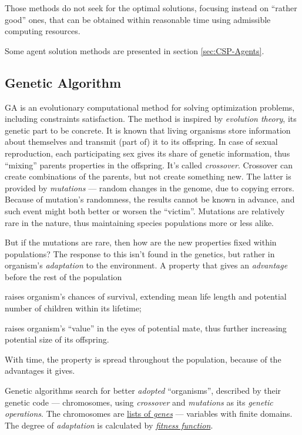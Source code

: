 \documentclass[ThesisDoc]{subfiles}
\begin{document}
\medskip

Those methods do not seek for the optimal solutions, focusing instead on
``rather good'' ones, that can be obtained within reasonable time using admissible
computing resources.

\bigskip

\noindent
Some agent solution methods are presented in section \ref{sec:CSP-Agents}.

\subsection{Genetic Algorithm}
GA is an evolutionary computational method for solving optimization problems,
including constraints satisfaction. The method is inspired by \emph{evolution
theory}, its genetic part to be concrete. It is known that living organisms
store information about themselves and transmit (part of) it to its offspring.
In case of sexual reproduction, each participating sex gives its share of
genetic information, thus ``mixing'' parents properties in the offspring.
It's called \emph{crossover}.
Crossover can create combinations of the parents, but not create something new.
The latter is provided by \emph{mutations} --- random changes in the genome, due
to copying errors. Because of mutation's randomness, the results cannot be known
in advance, and such event might both better or worsen the ``victim''. Mutations
are relatively rare in the nature, thus maintaining species populations more or
less alike.

But if the mutations are rare, then how are the new properties fixed within
populations? The response to this isn't found in the genetics, but rather in
organism's \emph{adaptation} to the environment. A property that gives an
\emph{advantage} before the rest of the population
\begin{enumerate*}[1)]
  \item raises organism's chances of survival, extending mean life length and
        potential number of children within its lifetime;
  \item raises organism's ``value'' in the eyes of potential mate, thus further
        increasing potential size of its offspring.
\end{enumerate*}
With time, the property is spread throughout the population, because of the
advantages it gives.

\bigskip\noindent
Genetic algorithms search for better \emph{adopted} ``organisms'', described
by their genetic code --- chromosomes, using \emph{crossover} and \emph{mutations}
as its \emph{genetic operations}.
The chromosomes are \underline{lists of \emph{genes}} --- variables with finite
domains. The degree of \emph{adaptation} is calculated by
\underline{\emph{fitness function}}.
\end{document}
